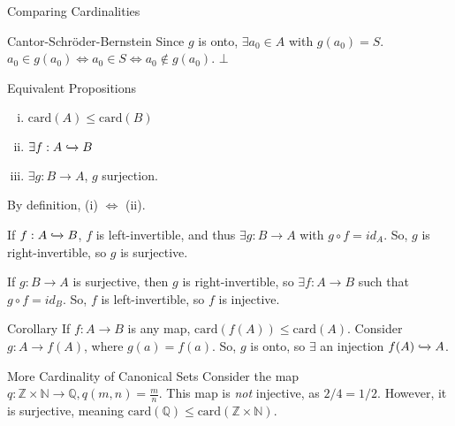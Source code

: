 \documentclass[8pt]{extarticle}
\begin{document}
\begin{problem}{Comparing Cardinalities}
\begin{problem}{Cantor-Schröder-Bernstein}
      Since $g$ is onto, $\exists a_0\in A$ with $g(a_0) = S$. $a_0 \in g(a_0) \Leftrightarrow a_0\in S \Leftrightarrow a_0\notin g(a_0)$. $\bot$
    \end{problem}
    \begin{problem}{Equivalent Propositions}
      \begin{enumerate}[(i)]
        \item $\text{card}(A) \leq \text{card}(B)$
        \item $\exists f: A\xhookrightarrow{} B$
        \item $\exists g: B\rightarrow A$, $g$ surjection.
      \end{enumerate}
      \tcblower
      By definition, (i) $\Leftrightarrow$ (ii).
      \begin{description}[font=\normalfont]
        \item[(ii) $\Rightarrow$ (iii)] If $f: A\xhookrightarrow{} B$, $f$ is left-invertible, and thus $\exists g: B\rightarrow A$ with $g\circ f = id_A$. So, $g$ is right-invertible, so $g$ is surjective.
        \item[(iii) $\Rightarrow$ (ii)] If $g: B \rightarrow A$ is surjective, then $g$ is right-invertible, so $\exists f: A\rightarrow B$ such that $g\circ f = id_B$. So, $f$ is left-invertible, so $f$ is injective.
      \end{description}
    \end{problem}
    \begin{problem}{Corollary}
      If $f: A\rightarrow B$ is any map, $\text{card}(f(A)) \leq \text{card}(A)$.
      \tcblower
      Consider $g: A\rightarrow f(A)$, where $g(a) = f(a)$. So, $g$ is onto, so $\exists$ an injection $f(A) \xhookrightarrow{} A$.
    \end{problem}
    \begin{problem}{More Cardinality of Canonical Sets}
      Consider the map $q: \mathbb{Z} \times \mathbb{N} \rightarrow \mathbb{Q}, q(m,n) = \frac{m}{n}$. This map is \textit{not} injective, as $2/4 = 1/2$. However, it is surjective, meaning $\text{card}(\mathbb{Q}) \leq \text{card}(\mathbb{Z} \times \mathbb{N})$.\\


\end{problem}
\end{problem}
\end{document}
